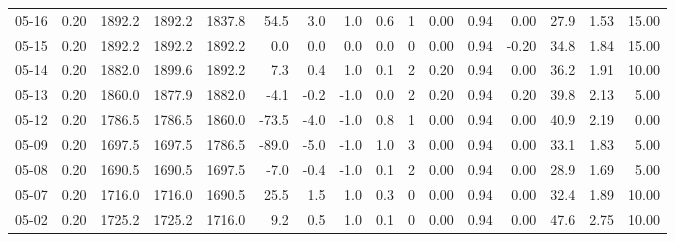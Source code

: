 \begin{threeparttable}
{\begin{tabular}{lrrrrrrrrrrrrrrr}
  05-16 &     0.20 & 1892.2 & 1892.2 & 1837.8 &       54.5 &            3.0 &                      1.0 &                 0.6 &              1 &       0.00 &      0.94 &           0.00 &             27.9 &            1.53 &                  15.00 \\
  05-15 &     0.20 & 1892.2 & 1892.2 & 1892.2 &        0.0 &            0.0 &                      0.0 &                 0.0 &              0 &       0.00 &      0.94 &          -0.20 &             34.8 &            1.84 &                  15.00 \\
  05-14 &     0.20 & 1882.0 & 1899.6 & 1892.2 &        7.3 &            0.4 &                      1.0 &                 0.1 &              2 &       0.20 &      0.94 &           0.00 &             36.2 &            1.91 &                  10.00 \\
  05-13 &     0.20 & 1860.0 & 1877.9 & 1882.0 &       -4.1 &           -0.2 &                     -1.0 &                 0.0 &              2 &       0.20 &      0.94 &           0.20 &             39.8 &            2.13 &                   5.00 \\
  05-12 &     0.20 & 1786.5 & 1786.5 & 1860.0 &      -73.5 &           -4.0 &                     -1.0 &                 0.8 &              1 &       0.00 &      0.94 &           0.00 &             40.9 &            2.19 &                   0.00 \\
  05-09 &     0.20 & 1697.5 & 1697.5 & 1786.5 &      -89.0 &           -5.0 &                     -1.0 &                 1.0 &              3 &       0.00 &      0.94 &           0.00 &             33.1 &            1.83 &                   5.00 \\
  05-08 &     0.20 & 1690.5 & 1690.5 & 1697.5 &       -7.0 &           -0.4 &                     -1.0 &                 0.1 &              2 &       0.00 &      0.94 &           0.00 &             28.9 &            1.69 &                   5.00 \\
  05-07 &     0.20 & 1716.0 & 1716.0 & 1690.5 &       25.5 &            1.5 &                      1.0 &                 0.3 &              0 &       0.00 &      0.94 &           0.00 &             32.4 &            1.89 &                  10.00 \\
  05-02 &     0.20 & 1725.2 & 1725.2 & 1716.0 &        9.2 &            0.5 &                      1.0 &                 0.1 &              0 &       0.00 &      0.94 &           0.00 &             47.6 &            2.75 &                  10.00 \\

\end{tabular}}
\end{threeparttable}
